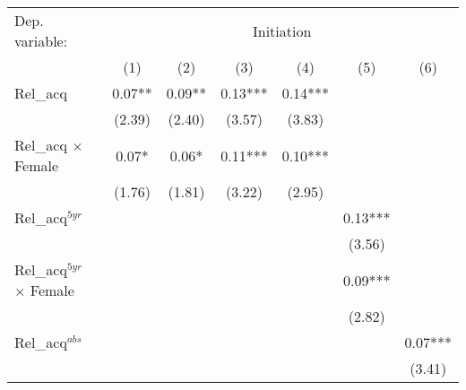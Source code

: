 {
\def\sym#1{\ifmmode^{#1}\else\(^{#1}\)\fi}
\begin{tabular*}{\hsize}{@{\hskip\tabcolsep\extracolsep\fill}l*{6}{c}}
\toprule
                Dep. variable: &\multicolumn{6}{c}{Initiation}                                               \\\cmidrule(lr){2-7}
                &\multicolumn{1}{c}{(1)}   &\multicolumn{1}{c}{(2)}   &\multicolumn{1}{c}{(3)}   &\multicolumn{1}{c}{(4)}   &\multicolumn{1}{c}{(5)}   &\multicolumn{1}{c}{(6)}   \\
\midrule
Rel\_acq&     0.07** &     0.09** &     0.13***&     0.14***&            &            \\
                &   (2.39)   &   (2.40)   &   (3.57)   &   (3.83)   &            &            \\
 
Rel\_acq $\times$ Female&     0.07*  &     0.06*  &     0.11***&     0.10***&            &            \\
                &   (1.76)   &   (1.81)   &   (3.22)   &   (2.95)   &            &            \\
 
Rel\_acq\(^{5yr}\)&            &            &            &            &     0.13***&            \\
                &            &            &            &            &   (3.56)   &            \\
 
Rel\_acq\(^{5yr}\) $\times$ Female&            &            &            &            &     0.09***&            \\
                &            &            &            &            &   (2.82)   &            \\
 
Rel\_acq\(^{abs}\)&            &            &            &            &            &     0.07***\\
                &            &            &            &            &            &   (3.41)   \\
 

\end{tabular*}}
